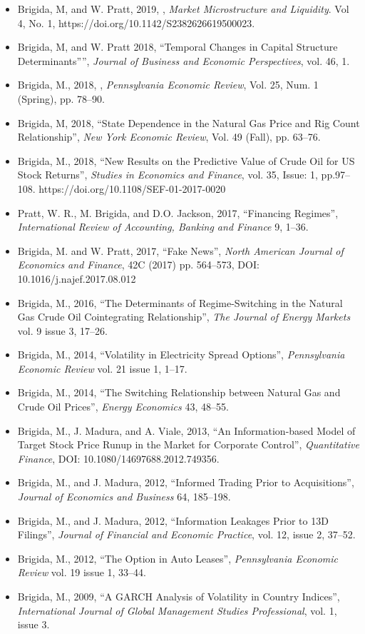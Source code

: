 \documentclass[9pt]{article}
\begin{document}
\begin{itemize}[noitemsep, nolistsep]
\item Brigida, M, and W. Pratt, 2019, \href{https://papers.ssrn.com/sol3/papers.cfm?abstract_id=3125788}{\color{Blue}{``Trade Intensity and Liquidity''}}, {\it Market Microstructure and Liquidity}. Vol 4, No. 1, https://doi.org/10.1142/S2382626619500023.
\item Brigida, M, and W. Pratt 2018, ``Temporal Changes in Capital Structure Determinants”'', {\it Journal of Business and Economic Perspectives}, vol. 46, 1.
\item Brigida, M., 2018, \href{http://www.econpea.org/pub/PER2018Issue25no1.pdf}{\color{Blue}{``Causes of Asymmetric Volatility in Oil Futures''}}, {\it Pennsylvania Economic Review\/}, Vol. 25, Num. 1 (Spring), pp. 78--90.
\item Brigida, M, 2018, ``State Dependence in the Natural Gas Price and Rig Count Relationship'', {\it New York Economic Review}, Vol. 49 (Fall), pp. 63--76.
\item Brigida, M., 2018, ``New Results on the Predictive Value of Crude Oil for US Stock Returns'', {\it Studies in Economics and Finance}, vol. 35, Issue: 1, pp.97--108. https://doi.org/10.1108/SEF-01-2017-0020
\item Pratt, W. R., M. Brigida, and D.O. Jackson, 2017, ``Financing Regimes'', {\it International Review of Accounting, Banking and Finance} 9, 1--36. \href{http://www.irabf.org/publication/Financing Regimes.pdf}{\color{Blue}{http://www.irabf.org/publication/Financing Regimes.pdf}}
\item Brigida, M. and W. Pratt, 2017, ``Fake News'', {\it North American Journal of Economics and Finance\/}, 42C (2017) pp. 564--573, DOI: 10.1016/j.najef.2017.08.012
\item Brigida, M., 2016, ``The Determinants of Regime-Switching in the Natural Gas Crude Oil Cointegrating Relationship'', {\it The Journal of Energy Markets} vol. 9 issue 3, 17--26.
\item Brigida, M., 2014, ``Volatility in Electricity Spread Options'', {\it Pennsylvania Economic Review} vol. 21 issue 1, 1--17.
\item Brigida, M., 2014, ``The Switching Relationship between Natural Gas and Crude Oil Prices'', {\it Energy Economics\/} 43, 48--55.  
\item Brigida, M., J. Madura, and A. Viale, 2013, ``An Information-based Model of Target Stock Price Runup in the Market for Corporate Control'', {\it Quantitative Finance\/}, DOI: 10.1080/14697688.2012.749356.
\item Brigida, M., and J. Madura, 2012, ``Informed Trading Prior to Acquisitions'', {\it Journal of Economics and Business} 64, 185--198.
\item Brigida, M., and J. Madura, 2012, ``Information Leakages Prior to 13D Filings'', {\it Journal of Financial and Economic Practice}, vol. 12, issue 2, 37--52.
\item Brigida, M., 2012, ``The Option in Auto Leases'', {\it Pennsylvania Economic Review} vol. 19 issue 1, 33--44.
\item Brigida, M., 2009, ``A GARCH Analysis of Volatility in Country Indices'', {\it International Journal of Global Management Studies Professional}, vol. 1, issue 3.
\end{itemize}
\end{document}
